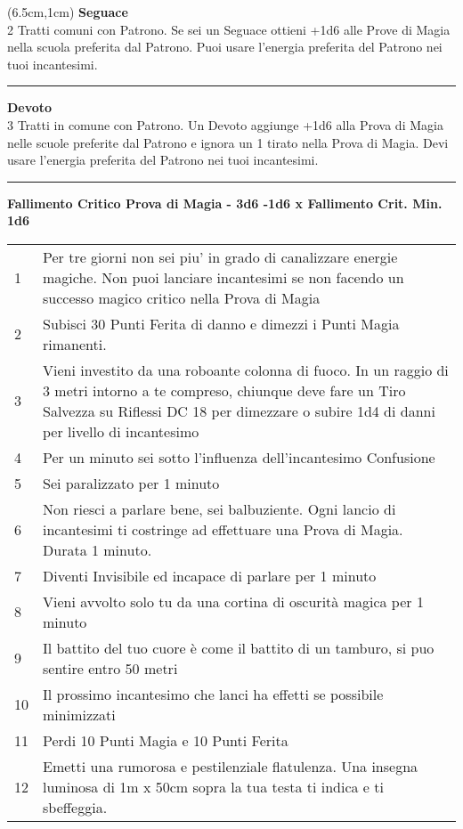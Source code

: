 \documentclass[a4paper,12 pt,openany]{book}
\newcommand{\riga}{\rule{\textwidth}{0.4pt}}
\begin{document}
\begin{textblock*}{13.5cm}(6.5cm,1cm) %
\textbf{Seguace}\\
2 Tratti comuni con Patrono. Se sei un Seguace ottieni +1d6 alle Prove di Magia nella scuola preferita dal Patrono. Puoi usare l'energia preferita del Patrono nei tuoi incantesimi.\\

\riga

\textbf{Devoto}\\
3 Tratti in comune con Patrono. Un Devoto aggiunge +1d6 alla Prova di Magia nelle scuole preferite dal Patrono e ignora un 1 tirato nella Prova di Magia. Devi usare l'energia preferita del Patrono nei tuoi incantesimi.

\riga

\textbf{Fallimento Critico Prova di Magia - 3d6 -1d6 x Fallimento Crit. Min. 1d6}
\begin{tabularx}{0.95\textwidth}{lX}
1 & Per tre giorni non sei piu' in grado di canalizzare energie magiche. Non puoi lanciare incantesimi se non facendo un successo magico critico nella Prova di Magia\\
2 & Subisci 30 Punti Ferita di danno e dimezzi i Punti Magia rimanenti.\\
3 & Vieni investito da una roboante colonna di fuoco. In un raggio di 3 metri intorno a te compreso, chiunque deve fare un Tiro Salvezza su Riflessi DC 18 per dimezzare o subire 1d4 di danni per livello di incantesimo\\
4 & Per un minuto sei sotto l'influenza dell'incantesimo Confusione\\
5 & Sei paralizzato per 1 minuto\\
6 & Non riesci a parlare bene, sei balbuziente. Ogni lancio di incantesimi ti costringe ad effettuare una Prova di Magia. Durata 1 minuto.\\
7 & Diventi Invisibile ed incapace di parlare per 1 minuto\\
8 & Vieni avvolto solo tu da una cortina di oscurità magica per 1 minuto\\
9 & Il battito del tuo cuore è come il battito di un tamburo, si puo sentire entro 50 metri\\
10 & Il prossimo incantesimo che lanci ha effetti se possibile minimizzati\\
11 & Perdi 10 Punti Magia e 10 Punti Ferita\\
12 & Emetti una rumorosa e pestilenziale flatulenza. Una insegna luminosa di 1m x 50cm sopra la tua testa ti indica e ti sbeffeggia.\\

\end{tabularx}
\end{textblock*}
\end{document}
